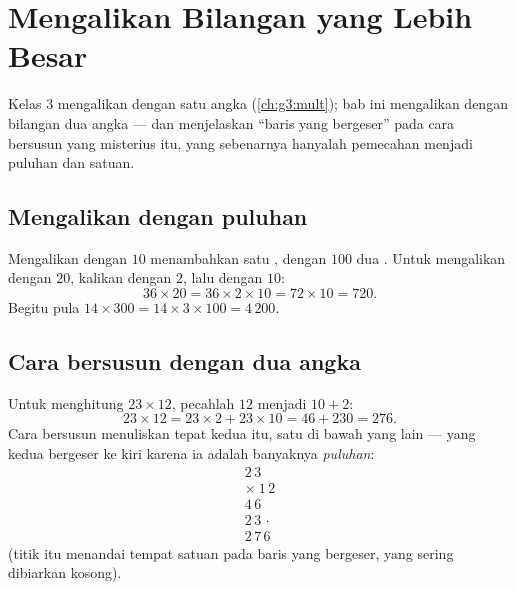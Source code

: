 \chapter{Mengalikan Bilangan yang Lebih Besar}\label{ch:g4:mult}

Kelas 3 mengalikan dengan satu angka (\cref{ch:g3:mult}); bab ini
mengalikan dengan bilangan dua angka --- dan menjelaskan ``baris
yang bergeser'' pada cara bersusun yang misterius itu, yang
sebenarnya hanyalah pemecahan menjadi puluhan dan satuan.

\section{Mengalikan dengan puluhan}

\begin{proposition}\label{prop:g4:mult:tens}
Mengalikan dengan $10$ menambahkan satu , dengan $100$ dua .
Untuk mengalikan dengan $20$, kalikan dengan $2$, lalu dengan $10$:
\[
36 \times 20 = 36 \times 2 \times 10 = 72 \times 10 = 720 .
\]
Begitu pula $14 \times 300 = 14 \times 3 \times 100 = 4\,200$.
\end{proposition}
\admitted

\section{Cara bersusun dengan dua angka}

\begin{example}\label{ex:g4:mult:why}
Untuk menghitung $23 \times 12$, pecahlah $12$ menjadi $10 + 2$:
\[
23 \times 12 = 23 \times 2 + 23 \times 10 = 46 + 230 = 276 .
\]
Cara bersusun menuliskan tepat kedua  itu, satu di bawah
yang lain --- yang kedua bergeser ke kiri karena ia adalah banyaknya
\emph{puluhan}:
\[
\begin{array}{r}
2\,3 \\
\times\ 1\,2 \\
\hline
4\,6 \\
2\,3\,\cdot \\
\hline
2\,7\,6
\end{array}
\]
(titik itu menandai tempat satuan pada baris yang bergeser, yang
sering dibiarkan kosong).
\end{example}


